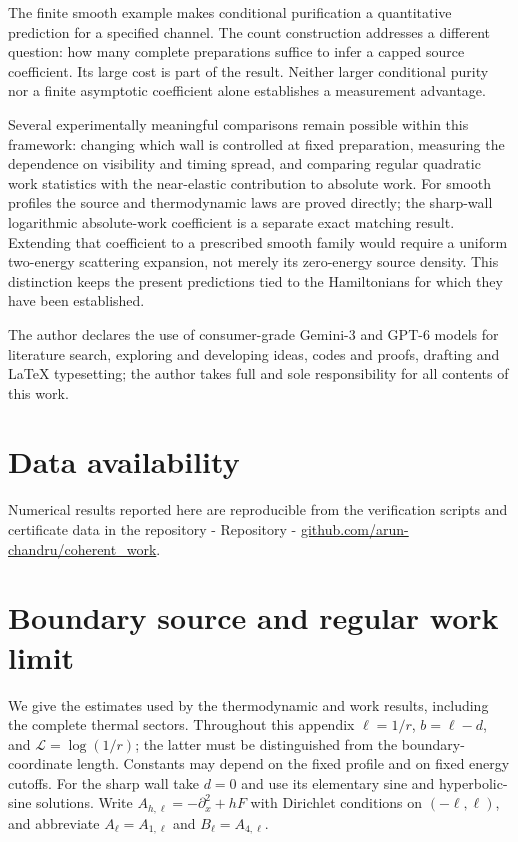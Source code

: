 \documentclass[aps,pra,reprint,superscriptaddress,longbibliography]{revtex4-2}
\begin{document}
The finite smooth example makes conditional purification a quantitative
prediction for a specified channel. The count construction addresses
a different question: how many complete preparations suffice to infer
a capped source coefficient. Its large cost is part of the result.
Neither larger conditional purity nor a finite asymptotic coefficient
alone establishes a measurement advantage.

Several experimentally meaningful comparisons remain possible within
this framework: changing which wall is controlled at fixed preparation,
measuring the dependence on visibility and timing spread, and comparing
regular quadratic work statistics with the near-elastic contribution
to absolute work. For smooth profiles the source and thermodynamic
laws are proved directly; the sharp-wall logarithmic absolute-work
coefficient is a separate exact matching result. Extending that
coefficient to a prescribed smooth family would require a uniform
two-energy scattering expansion, not merely its zero-energy source
density. This distinction keeps the present predictions tied to the
Hamiltonians for which they have been established.

\begin{acknowledgments}
The author declares the use of consumer-grade Gemini-3 and GPT-6 models for literature search, exploring and developing ideas, codes and proofs, drafting and LaTeX typesetting; the author takes full and sole responsibility for all contents of this work.
\end{acknowledgments}

\section*{Data availability}
Numerical results reported here are reproducible from the verification
scripts and certificate data in the repository - Repository - 
\href{https://github.com/arun-chandru/coherent_work}{github.com/arun-chandru/coherent\_work}.

\appendix

\section{Boundary source and regular work limit}
\label{app:source}

We give the estimates used by the thermodynamic and work results,
including the complete thermal sectors. Throughout this appendix
$\ell=1/r$, $b=\ell-d$, and $\mathcal L=\log(1/r)$; the latter must
be distinguished from the boundary-coordinate length. Constants may
depend on the fixed profile and on fixed energy cutoffs. For the sharp
wall take $d=0$ and use its elementary sine and hyperbolic-sine solutions.
Write $A_{h,\ell}=-\partial_x^2+hF$ with Dirichlet conditions on
$(-\ell,\ell)$, and abbreviate $A_\ell=A_{1,\ell}$ and
$B_\ell=A_{4,\ell}$.
\end{document}
